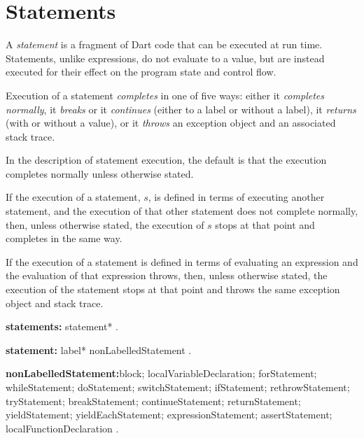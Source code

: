 \documentclass{article}
\begin{document}
\section{Statements}

\LMHash{}
A {\em statement} is a fragment of Dart code that can be executed at run time. Statements, unlike expressions, do not evaluate to a value, but are instead executed for their effect on the program state and control flow.

\label{completion}
Execution of a statement {\em completes} in one of five ways: either it {\em completes normally}, it {\em breaks} or it {\em continues} (either to a label or without a label), it {\em returns} (with or without a value), or it {\em throws} an exception object and an associated stack trace.

In the description of statement execution, the default is that the execution
completes normally unless otherwise stated.

If the execution of a statement, $s$, is defined in terms of executing
another statement,
and the execution of that other statement does not complete normally,
then, unless otherwise stated, the execution of $s$ stops
at that point and completes in the same way.

If the execution of a statement is defined in terms of evaluating an expression
and the evaluation of that expression throws,
then, unless otherwise stated, the execution of the statement stops
at that point and throws the same exception object and stack trace.

\LMHash{}

 \begin{grammar}
{\bf statements:}
      statement*
    .


{\bf statement:}
      label* nonLabelledStatement
    .

{\bf nonLabelledStatement:}block;
      localVariableDeclaration;
      forStatement;
      whileStatement;
      doStatement;
      switchStatement;
      ifStatement;
      rethrowStatement;
      tryStatement;
      breakStatement;
      continueStatement;
      returnStatement;
      yieldStatement;
      yieldEachStatement;
      expressionStatement;
      assertStatement;
      localFunctionDeclaration
    .
 \end{grammar}
\end{document}
